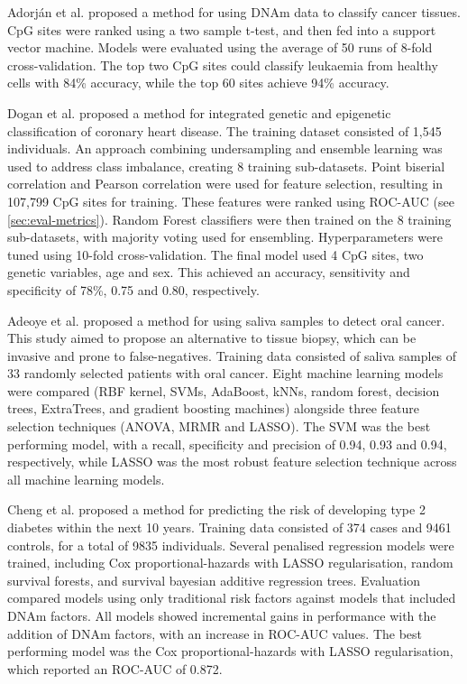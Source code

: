 \documentclass{article} %
\begin{document}
Adorj\'an et al. \cite{adorjan2002tumour} proposed a method for using DNAm data to classify cancer tissues. CpG sites were ranked using a two sample t-test, and then fed into a support vector machine. Models were evaluated using the average of 50 runs of 8-fold cross-validation. The top two CpG sites could classify leukaemia from healthy cells with 84\% accuracy, while the top 60 sites achieve 94\% accuracy.

Dogan et al. \cite{dogan2018integrated} proposed a method for integrated genetic and epigenetic classification of coronary heart disease. The training dataset consisted of 1,545 individuals. An approach combining undersampling and ensemble learning \cite{liu2008exploratory} was used to address class imbalance, creating 8 training sub-datasets. Point biserial correlation and Pearson correlation were used for feature selection, resulting in 107,799 CpG sites for training. These features were ranked using ROC-AUC (see \ref{sec:eval-metrics}). Random Forest classifiers were then trained on the 8 training sub-datasets, with majority voting used for ensembling. Hyperparameters were tuned using 10-fold cross-validation. The final model used 4 CpG sites, two genetic variables, age and sex. This achieved an accuracy, sensitivity and specificity of 78\%, 0.75 and 0.80, respectively.

Adeoye et al. \cite{adeoye2022machine} proposed a method for using saliva samples to detect oral cancer. This study aimed to propose an alternative to tissue biopsy, which can be invasive and prone to false-negatives. Training data consisted of saliva samples of 33 randomly selected patients with oral cancer. Eight machine learning models were compared (RBF kernel, SVMs, AdaBoost, kNNs, random forest, decision trees, ExtraTrees, and gradient boosting machines) alongside three feature selection techniques (ANOVA, MRMR and LASSO). The SVM was the best performing model, with a recall, specificity and precision of 0.94, 0.93 and 0.94, respectively, while LASSO was the most robust feature selection technique across all machine learning models.

Cheng et al. \cite{cheng2023development} proposed a method for predicting the risk of developing type 2 diabetes within the next 10 years. Training data consisted of 374 cases and \num{9461} controls, for a total of \num{9835} individuals. Several penalised regression models were trained, including Cox proportional-hazards with LASSO regularisation, random survival forests, and survival bayesian additive regression trees. Evaluation compared models using only traditional risk factors against models that included DNAm factors. All models showed incremental gains in performance with the addition of DNAm factors, with an increase in ROC-AUC values. The best performing model was the Cox proportional-hazards with LASSO regularisation, which reported an ROC-AUC of 0.872.
\end{document}
